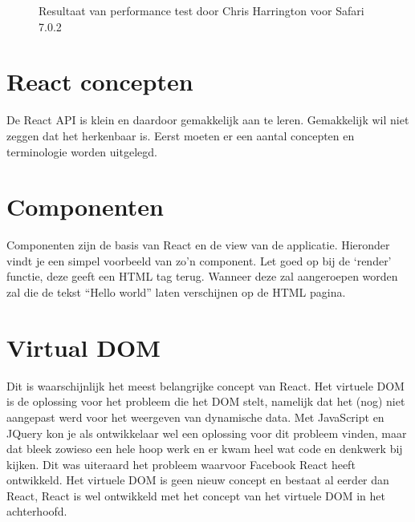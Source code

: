 \begin{figure}
{
		}
		\caption{Resultaat van performance test door Chris Harrington voor Safari 7.0.2}%
		\label{fig:ressafari}%
	\end{figure}
	
\section{React concepten}
		
	De React API is klein en daardoor gemakkelijk aan te leren. Gemakkelijk wil niet zeggen dat het herkenbaar is. Eerst moeten er een aantal concepten en terminologie worden uitgelegd.

\section{Componenten}
	
	Componenten zijn de basis van React en de view van de applicatie. Hieronder vindt je een simpel voorbeeld van zo’n component. Let goed op bij de `render' functie, deze geeft een HTML tag terug. Wanneer deze zal aangeroepen worden zal die de tekst ``Hello world'' laten verschijnen op de HTML pagina.
	

\section{Virtual DOM}
	
	Dit is waarschijnlijk het meest belangrijke concept van React. Het virtuele DOM is de oplossing voor het probleem die het DOM stelt, namelijk dat het (nog) niet aangepast werd voor het weergeven van dynamische data. Met JavaScript en JQuery kon je als ontwikkelaar wel een oplossing voor dit probleem vinden, maar dat bleek zowieso een hele hoop werk en er kwam heel wat code en denkwerk bij kijken. Dit was uiteraard het probleem waarvoor Facebook React heeft ontwikkeld. Het virtuele DOM is geen nieuw concept en bestaat al eerder dan React, React is wel ontwikkeld met het concept van het virtuele DOM in het achterhoofd.
	
